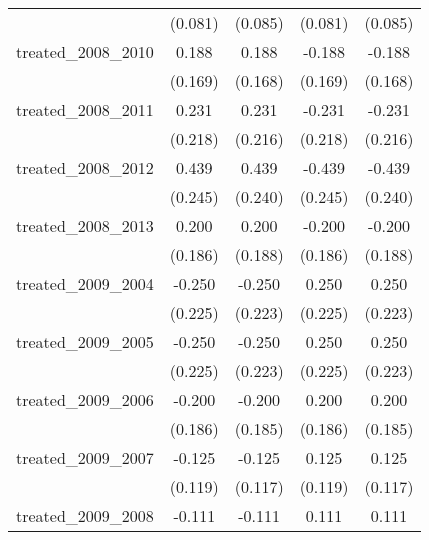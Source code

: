 {\begin{tabular}{l*{4}{c}}
            &     (0.081)         &     (0.085)         &     (0.081)         &     (0.085)         \\
[1em]
treated\_2008\_2010&       0.188         &       0.188         &      -0.188         &      -0.188         \\
            &     (0.169)         &     (0.168)         &     (0.169)         &     (0.168)         \\
[1em]
treated\_2008\_2011&       0.231         &       0.231         &      -0.231         &      -0.231         \\
            &     (0.218)         &     (0.216)         &     (0.218)         &     (0.216)         \\
[1em]
treated\_2008\_2012&       0.439         &       0.439         &      -0.439         &      -0.439         \\
            &     (0.245)         &     (0.240)         &     (0.245)         &     (0.240)         \\
[1em]
treated\_2008\_2013&       0.200         &       0.200         &      -0.200         &      -0.200         \\
            &     (0.186)         &     (0.188)         &     (0.186)         &     (0.188)         \\
[1em]
treated\_2009\_2004&      -0.250         &      -0.250         &       0.250         &       0.250         \\
            &     (0.225)         &     (0.223)         &     (0.225)         &     (0.223)         \\
[1em]
treated\_2009\_2005&      -0.250         &      -0.250         &       0.250         &       0.250         \\
            &     (0.225)         &     (0.223)         &     (0.225)         &     (0.223)         \\
[1em]
treated\_2009\_2006&      -0.200         &      -0.200         &       0.200         &       0.200         \\
            &     (0.186)         &     (0.185)         &     (0.186)         &     (0.185)         \\
[1em]
treated\_2009\_2007&      -0.125         &      -0.125         &       0.125         &       0.125         \\
            &     (0.119)         &     (0.117)         &     (0.119)         &     (0.117)         \\
[1em]
treated\_2009\_2008&      -0.111         &      -0.111         &       0.111         &       0.111         \\

\end{tabular}}
